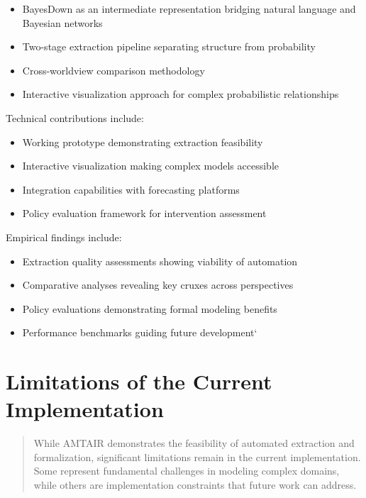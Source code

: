 \documentclass[12pt,a4paper]{report}
\providecommand{\tightlist}{%
  \setlength{\itemsep}{0pt}\setlength{\parskip}{0pt}}
\begin{document}
\begin{itemize}
\tightlist
\item
  BayesDown as an intermediate representation bridging natural language
  and Bayesian networks
\item
  Two-stage extraction pipeline separating structure from probability
\item
  Cross-worldview comparison methodology
\item
  Interactive visualization approach for complex probabilistic
  relationships
\end{itemize}

Technical contributions include:

\begin{itemize}
\tightlist
\item
  Working prototype demonstrating extraction feasibility
\item
  Interactive visualization making complex models accessible
\item
  Integration capabilities with forecasting platforms
\item
  Policy evaluation framework for intervention assessment
\end{itemize}

Empirical findings include:

\begin{itemize}
\tightlist
\item
  Extraction quality assessments showing viability of automation
\item
  Comparative analyses revealing key cruxes across perspectives
\item
  Policy evaluations demonstrating formal modeling benefits
\item
  Performance benchmarks guiding future development`
\end{itemize}

\section{Limitations of the Current
Implementation}\label{sec-limitations}

\begin{quote}
While AMTAIR demonstrates the feasibility of automated extraction and
formalization, significant limitations remain in the current
implementation. Some represent fundamental challenges in modeling
complex domains, while others are implementation constraints that future
work can address.
\end{quote}
\end{document}
